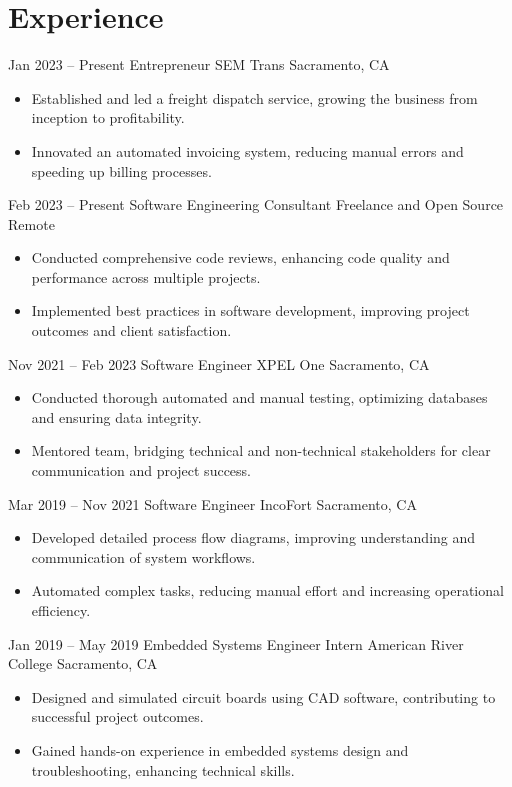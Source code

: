 \section{Experience}

\cventry
    {Jan 2023 -- Present}
    {Entrepreneur}
    {SEM Trans}
    {Sacramento, CA}
    {}
    {%
        \begin{itemize}
            \item Established and led a freight dispatch service, growing
            the business from inception to profitability.
            \item Innovated an automated invoicing system, reducing manual
            errors and speeding up billing processes.
        \end{itemize}
    }

\cventry
    {Feb 2023 -- Present}
    {Software Engineering Consultant}
    {Freelance and Open Source}
    {Remote}
    {}
    {%
        \begin{itemize}
            \item Conducted comprehensive code reviews, enhancing code
            quality and performance across multiple projects.
            \item Implemented best practices in software development,
            improving project outcomes and client satisfaction.
        \end{itemize}
    }

\cventry
    {Nov 2021 -- Feb 2023}
    {Software Engineer}
    {XPEL One}
    {Sacramento, CA}
    {}
    {%
        \begin{itemize}
            \item Conducted thorough automated and manual testing,
            optimizing databases and ensuring data integrity.
            \item Mentored team, bridging technical and non-technical
            stakeholders for clear communication and project success.
        \end{itemize}
    }

\cventry
    {Mar 2019 -- Nov 2021}
    {Software Engineer}
    {IncoFort}
    {Sacramento, CA}
    {}
    {%
        \begin{itemize}
            \item Developed detailed process flow diagrams, improving
            understanding and communication of system workflows.
            \item Automated complex tasks, reducing manual effort and
            increasing operational efficiency.
        \end{itemize}
    }

\cventry
    {Jan 2019 -- May 2019}
    {Embedded Systems Engineer Intern}
    {American River College}
    {Sacramento, CA}
    {}
    {%
        \begin{itemize}
            \item Designed and simulated circuit boards using CAD software,
            contributing to successful project outcomes.
            \item Gained hands-on experience in embedded systems design and
            troubleshooting, enhancing technical skills.
        \end{itemize}
    }